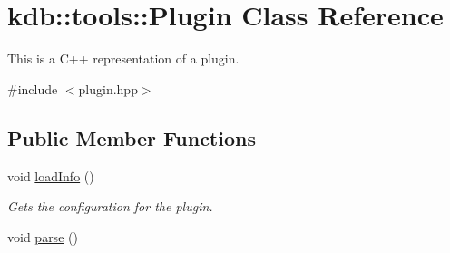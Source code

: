 \hypertarget{classkdb_1_1tools_1_1Plugin}{\section{kdb\-:\-:tools\-:\-:Plugin Class Reference}
\label{classkdb_1_1tools_1_1Plugin}
}


This is a C++ representation of a plugin.  




{\ttfamily \#include $<$plugin.\-hpp$>$}

\subsection*{Public Member Functions}
\begin{DoxyCompactItemize}
\item 
\hypertarget{classkdb_1_1tools_1_1Plugin_a3a0c6a956d1714002ef9baf8c9d99167}{void \hyperlink{classkdb_1_1tools_1_1Plugin_a3a0c6a956d1714002ef9baf8c9d99167}{load\-Info} ()}\label{classkdb_1_1tools_1_1Plugin_a3a0c6a956d1714002ef9baf8c9d99167}

\begin{DoxyCompactList}\small\item\em Gets the configuration for the plugin. \end{DoxyCompactList}\item 
\hypertarget{classkdb_1_1tools_1_1Plugin_adfcba2fbdeb436a1083410df804d5fb0}{void \hyperlink{classkdb_1_1tools_1_1Plugin_adfcba2fbdeb436a1083410df804d5fb0}{parse} ()}\label{classkdb_1_1tools_1_1Plugin_adfcba2fbdeb436a1083410df804d5fb0}


\end{DoxyCompactItemize}
